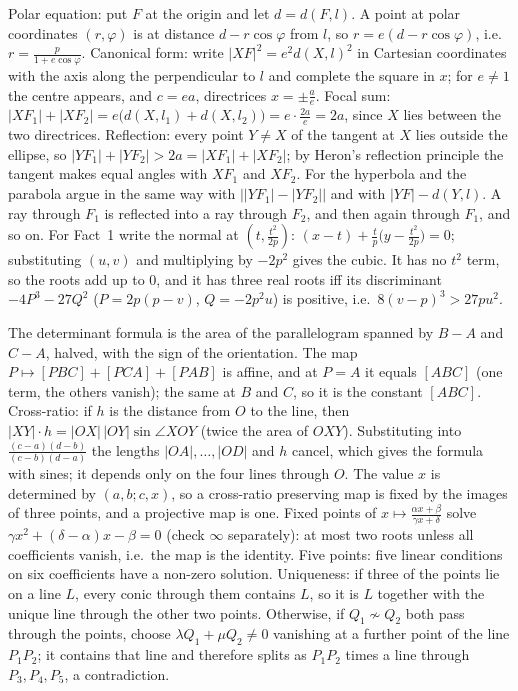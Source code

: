 \documentclass[11pt,a4paper]{article}
\begin{document}

 Polar equation: put $F$ at the origin and let $d=d(F,l)$. A point at polar coordinates $(r,\varphi)$ is at distance $d-r\cos\varphi$ from $l$, so $r=e(d-r\cos\varphi)$, i.e.\ $r=\frac p{1+e\cos\varphi}$. Canonical form: write $|XF|^2=e^2d(X,l)^2$ in Cartesian coordinates with the axis along the perpendicular to $l$ and complete the square in $x$; for $e\ne1$ the centre appears, and $c=ea$, directrices $x=\pm\frac ae$.
 Focal sum: $|XF_1|+|XF_2|=e\bigl(d(X,l_1)+d(X,l_2)\bigr)=e\cdot\frac{2a}e=2a$, since $X$ lies between the two directrices. Reflection: every point $Y\ne X$ of the tangent at $X$ lies outside the ellipse, so $|YF_1|+|YF_2|>2a=|XF_1|+|XF_2|$; by Heron's reflection principle the tangent makes equal angles with $XF_1$ and $XF_2$. For the hyperbola and the parabola argue in the same way with $\bigl||YF_1|-|YF_2|\bigr|$ and with $|YF|-d(Y,l)$.
 A ray through $F_1$ is reflected into a ray through $F_2$, and then again through $F_1$, and so on. For Fact~1 write the normal at $(t,\frac{t^2}{2p})$: $(x-t)+\frac tp\bigl(y-\frac{t^2}{2p}\bigr)=0$; substituting $(u,v)$ and multiplying by $-2p^2$ gives the cubic. It has no $t^2$ term, so the roots add up to $0$, and it has three real roots iff its discriminant $-4P^3-27Q^2$ ($P=2p(p-v)$, $Q=-2p^2u$) is positive, i.e.\ $8(v-p)^3>27pu^2$.

 The determinant formula is the area of the parallelogram spanned by $B-A$ and $C-A$, halved, with the sign of the orientation. The map $P\mapsto[PBC]+[PCA]+[PAB]$ is affine, and at $P=A$ it equals $[ABC]$ (one term, the others vanish); the same at $B$ and $C$, so it is the constant $[ABC]$.
 Cross-ratio: if $h$ is the distance from $O$ to the line, then $|XY|\cdot h=|OX|\,|OY|\sin\angle XOY$ (twice the area of $OXY$). Substituting into $\frac{(c-a)(d-b)}{(c-b)(d-a)}$ the lengths $|OA|,\dots,|OD|$ and $h$ cancel, which gives the formula with sines; it depends only on the four lines through $O$.
 The value $x$ is determined by $(a,b;c,x)$, so a cross-ratio preserving map is fixed by the images of three points, and a projective map is one. Fixed points of $x\mapsto\frac{\alpha x+\beta}{\gamma x+\delta}$ solve $\gamma x^2+(\delta-\alpha)x-\beta=0$ (check $\infty$ separately): at most two roots unless all coefficients vanish, i.e.\ the map is the identity.
 Five points: five linear conditions on six coefficients have a non-zero solution. Uniqueness: if three of the points lie on a line $L$, every conic through them contains $L$, so it is $L$ together with the unique line through the other two points. Otherwise, if $Q_1\not\sim Q_2$ both pass through the points, choose $\lambda Q_1+\mu Q_2\ne0$ vanishing at a further point of the line $P_1P_2$; it contains that line and therefore splits as $P_1P_2$ times a line through $P_3,P_4,P_5$, a contradiction.
\end{document}
